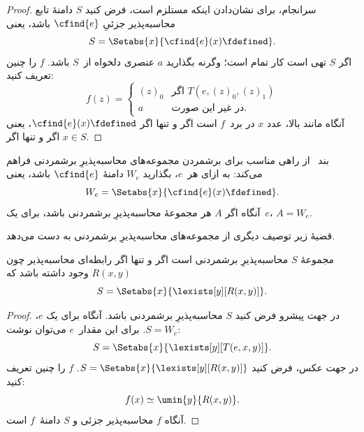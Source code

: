 \documentclass[../../../include/open-logic-section]{subfiles}
\begin{document}
\begin{proof}
سرانجام، برای نشان‌دادن اینکه  مستلزم
 است، فرض کنید $S$ دامنهٔ تابع محاسبه‌پذیر جزئیِ
$\cfind{e}$ باشد، یعنی
\[
S = \Setabs{x}{\cfind{e}(x) \fdefined}.
\]
اگر $S$ تهی است کار تمام است؛ وگرنه بگذارید $a$ عنصری دلخواه از~$S$
باشد. $f$ را چنین تعریف کنید:
\[
f(z) = \begin{cases}
(z)_0 & \text{اگر $T(e,(z)_0,(z)_1)$} \\
a & \text{در غیر این صورت.}
\end{cases}
\]
آنگاه مانند بالا، عدد $x$ در برد~$f$ است اگر و تنها اگر
$\cfind{e}(x)\fdefined$، یعنی اگر و تنها اگر $x\in S$.
\end{proof}

بند~ از  راهی مناسب برای
برشمردن مجموعه‌های محاسبه‌پذیرِ برشمردنی فراهم می‌کند: به ازای هر~$e$،
بگذارید $W_e$ دامنهٔ $\cfind{e}$ باشد، یعنی
\[
W_e = \Setabs{x}{\cfind{e}(x) \fdefined}.
\]
آنگاه اگر $A$ هر مجموعهٔ محاسبه‌پذیرِ برشمردنی باشد، برای یک~$e$،
$A=W_e$.

قضیهٔ زیر توصیف دیگری از مجموعه‌های محاسبه‌پذیرِ برشمردنی به دست
می‌دهد.

\begin{thm}
مجموعهٔ $S$ محاسبه‌پذیرِ برشمردنی است اگر و تنها اگر رابطه‌ای
محاسبه‌پذیر چون $R(x,y)$ وجود داشته باشد که
\[
S = \Setabs{ x }{ \lexists[y][R(x,y)] }.
\]
\end{thm}

\begin{proof}
در جهت پیشرو فرض کنید $S$ محاسبه‌پذیرِ برشمردنی باشد. آنگاه برای یک
$e$، $S=W_e$. برای این مقدار~$e$ می‌توان نوشت:
\[
S = \Setabs{ x }{ \lexists[y][T(e, x, y)] }.
\]
در جهت عکس، فرض کنید
$S=\Setabs{x}{\lexists[y][R(x,y)]}$. $f$ را چنین تعریف کنید:
\[
f(x) \simeq \umin{y}{R(x, y)}.
\]
آنگاه $f$ محاسبه‌پذیر جزئی و $S$ دامنهٔ~$f$ است.
\end{proof}
\end{document}
